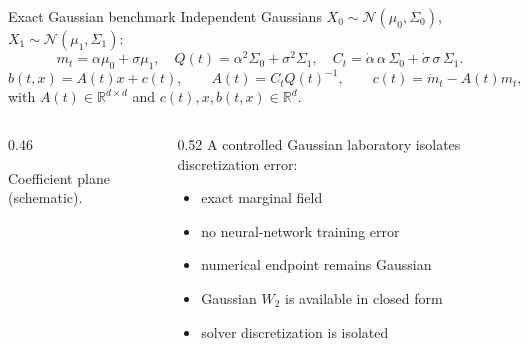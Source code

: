 \documentclass[aspectratio=169,10pt,c]{beamer}
\newcommand{\wtwo}{W_2}
\newcommand{\citefoot}[1]{{\tiny\color{fsgray}\citep{#1}}}
\newcommand{\sourcenote}[1]{{\scriptsize\color{fsgray}#1}}
\begin{document}
\begin{frame}{Exact Gaussian benchmark}
  \footnotesize
  Independent Gaussians \(X_0\sim\mathcal{N}(\mu_0,\Sigma_0)\),
  \(X_1\sim\mathcal{N}(\mu_1,\Sigma_1)\):
  \[
    m_t=\alpha\mu_0+\sigma\mu_1,
    \quad
    Q(t)=\alpha^2\Sigma_0+\sigma^2\Sigma_1,
    \quad
    C_t=\dot\alpha\,\alpha\,\Sigma_0+\dot\sigma\,\sigma\,\Sigma_1.
  \]
  \[
    b(t,x)=A(t)x+c(t),
    \qquad
    A(t)=C_t Q(t)^{-1},
    \qquad
    c(t)=\dot m_t-A(t)m_t,
  \]
  with \(A(t)\in\mathbb{R}^{d\times d}\) and \(c(t),x,b(t,x)\in\mathbb{R}^d\).

  \begin{columns}[T,onlytextwidth]
    \begin{column}{0.46\textwidth}
      \begin{center}
      \end{center}
      \sourcenote{Coefficient plane (schematic).}
    \end{column}
    \begin{column}{0.52\textwidth}
      A controlled Gaussian laboratory isolates discretization error:
      \begin{itemize}\itemsep=0.12em
        \item exact marginal field
        \item no neural-network training error
        \item numerical endpoint remains Gaussian
        \item Gaussian \(\wtwo\) is available in closed form
        \item solver discretization is isolated
      \end{itemize}
    \end{column}
  \end{columns}
  \vspace{0.04cm}
  \citefoot{albergo2025stochastic,lipman2023flow,gelbrich1990formula}
\end{frame}
\end{document}
